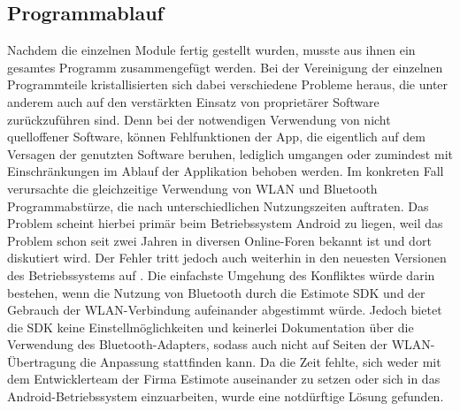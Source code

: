 \subsection{Programmablauf}
Nachdem die einzelnen Module fertig gestellt wurden, musste aus ihnen ein gesamtes Programm zusammengefügt werden. Bei der Vereinigung der einzelnen Programmteile kristallisierten sich dabei verschiedene Probleme heraus, die unter anderem auch auf den verstärkten Einsatz von proprietärer Software zurückzuführen sind. Denn bei der notwendigen Verwendung von nicht quelloffener Software, können Fehlfunktionen der App, die eigentlich auf dem Versagen der genutzten Software beruhen, lediglich umgangen oder zumindest mit Einschränkungen im Ablauf der Applikation behoben werden. Im konkreten Fall verursachte die gleichzeitige Verwendung von WLAN und Bluetooth Programmabstürze, die nach unterschiedlichen Nutzungszeiten auftraten. Das Problem scheint hierbei primär beim Betriebssystem Android zu liegen, weil das Problem schon seit zwei Jahren in diversen Online-Foren bekannt ist und dort diskutiert wird. Der Fehler tritt jedoch auch weiterhin in den neuesten Versionen des Betriebssystems auf \cite{AndWLBT}. Die einfachste Umgehung des Konfliktes würde darin bestehen, wenn die Nutzung von Bluetooth durch die Estimote SDK und der Gebrauch der WLAN-Verbindung aufeinander abgestimmt würde. Jedoch bietet die SDK keine Einstellmöglichkeiten und keinerlei Dokumentation über die Verwendung des Bluetooth-Adapters, sodass auch nicht auf Seiten der WLAN-Übertragung die Anpassung stattfinden kann. Da die Zeit fehlte, sich weder mit dem Entwicklerteam der Firma Estimote auseinander zu setzen oder sich in das Android-Betriebssystem einzuarbeiten, wurde eine notdürftige Lösung gefunden. \\ \\
